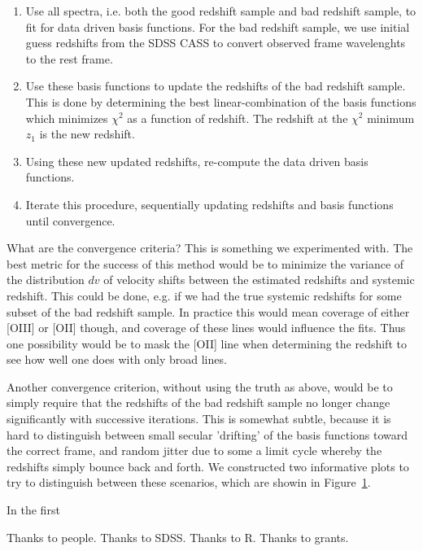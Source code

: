\documentclass[preprint]{aastex}
\begin{document}
\begin{enumerate}
\item{} Use all spectra, i.e. both the good redshift sample and bad
  redshift sample, to fit for data driven basis functions.  For the
  bad redshift sample, we use initial guess redshifts from the SDSS
  CASS to convert observed frame wavelenghts to the rest frame.

\item{} Use these basis functions to update the redshifts of the bad
redshift sample. This is done by determining the best linear-combination
of the basis functions which minimizes $\chi^2$ as a function of redshift. The
redshift at the $\chi^2$ minimum $z_{1}$ is the new redshift. 

\item{} Using these new updated redshifts, re-compute the data driven basis
functions. 

\item{} Iterate this procedure, sequentially updating redshifts and basis
functions until convergence. 
\end{enumerate}

What are the convergence criteria? This is something we experimented with. The
best metric for the success of this method would be to minimize the variance
of the distribution $dv$ of velocity shifts between the estimated redshifts
and systemic redshift. This could be done, e.g. if we had the true systemic
redshifts for some subset of the bad redshift sample. In practice this would
mean coverage of either [OIII] or [OII] though, and coverage of these lines
would influence the fits. Thus one possibility would be to mask the [OII] line
when determining the redshift to see how well one does with only broad lines. 

Another convergence criterion, without using the truth as above, would
be to simply require that the redshifts of the bad redshift sample no 
longer change significantly with successive iterations. This is somewhat
subtle, because it is hard to distinguish between small secular 'drifting' of 
the basis functions toward the correct frame, and random jitter due to some
a limit cycle whereby the redshifts simply bounce back and forth. We
constructed two informative plots to try to distinguish between these
scenarios, which are showin in Figure~\ref{fig:plots}. 

In the first 
\begin{figure}[!t]
  \centerline{
    }
  \caption{ \label{fig:plots}}
\end{figure}







\acknowledgements
Thanks to people.  Thanks to SDSS.  Thanks to R.  Thanks to grants.
\end{document}
